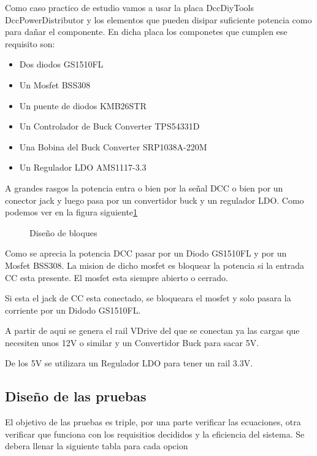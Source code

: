 
Como caso practico de estudio vamos a usar la placa DccDiyTools DccPowerDistributor y los elementos que
pueden disipar suficiente potencia como para dañar el componente. En dicha placa los
componetes que cumplen ese requisito son:
\begin{itemize}
    \item Dos diodos GS1510FL
    \item Un Mosfet BSS308
    \item Un puente de diodos KMB26STR
    \item Un Controlador de Buck Converter TPS54331D
    \item Una Bobina del Buck Converter SRP1038A-220M
    \item Un Regulador LDO AMS1117-3.3
\end{itemize}
A grandes rasgos la potencia entra o bien por la señal DCC o bien por un conector jack y luego pasa por un convertidor buck y un regulador LDO. Como podemos ver en la figura siguiente\ref{fig:Bloques}
\begin{figure}[H]
    \centering
    
    \caption{Diseño de bloques}
    \label{fig:Bloques}
\end{figure}

Como se aprecia la potencia DCC pasar por un Diodo GS1510FL y por un Mosfet BSS308. La mision de dicho mosfet es bloquear la potencia si la entrada CC esta presente. El mosfet esta siempre abierto o cerrado.

Si esta el jack de CC esta conectado, se bloqueara el mosfet y solo pasara la corriente por un Didodo GS1510FL.

A partir de aqui se genera el rail VDrive del que se conectan ya las cargas que necesiten unos 12V o similar y un Convertidor Buck para sacar 5V.

De los 5V se utilizara un Regulador LDO para tener un rail 3.3V.

\subsection{Diseño de las pruebas}
El objetivo de las pruebas es triple, por una parte verificar las ecuaciones, otra verificar que funciona con los requisitios decididos y la eficiencia del sistema.
Se debera llenar la siguiente tabla para cada opcion

